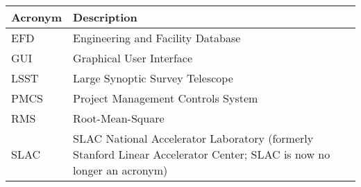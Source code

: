 \addtocounter{table}{-1}
\begin{longtable}{p{}p{}}\hline
\textbf{Acronym} & \textbf{Description}  \\\hline

EFD & Engineering and Facility Database \\\hline
GUI & Graphical User Interface \\\hline
LSST & Large Synoptic Survey Telescope \\\hline
PMCS & Project Management Controls System \\\hline
RMS & Root-Mean-Square \\\hline
SLAC & SLAC National Accelerator Laboratory (formerly Stanford Linear Accelerator Center; SLAC is now no longer an acronym) \\\hline
\end{longtable}
